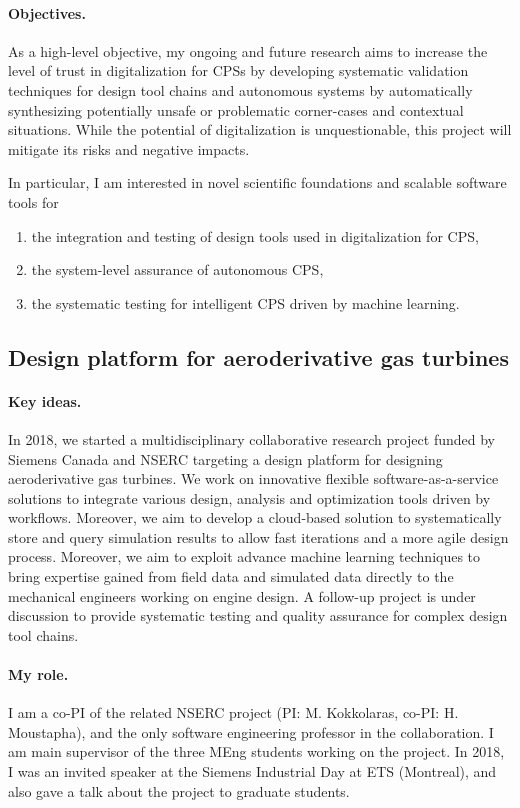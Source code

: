 \paragraph{Objectives.}
As a high-level objective, my ongoing and future research aims to increase the level of trust in digitalization for CPSs by developing systematic validation techniques for design tool chains and autonomous systems by automatically synthesizing potentially unsafe or problematic corner-cases and contextual situations. While the potential of digitalization is unquestionable, this project will mitigate its risks and negative impacts.

In particular, I am interested in novel scientific foundations and scalable software tools for 
\begin{enumerate}
\item the integration and testing of design tools used in digitalization for CPS, 
\item the system-level assurance of autonomous CPS,
\item the systematic testing for intelligent CPS driven by machine learning. 
\end{enumerate}

\subsection{Design platform for aeroderivative gas turbines}

\paragraph{Key ideas.} 
In 2018, we started a multidisciplinary collaborative research project funded by Siemens Canada and NSERC targeting a design platform for designing aeroderivative gas turbines. %
We work on innovative flexible software-as-a-service solutions to integrate various design, analysis and optimization tools driven by workflows. Moreover, we aim to develop a cloud-based solution to systematically store and query simulation results to allow fast iterations and a more agile design process. Moreover, we aim to exploit advance machine learning techniques to bring expertise gained from field data and simulated data directly to the mechanical engineers working on engine design. A follow-up project is under discussion to provide systematic testing and quality assurance for complex design tool chains.

\paragraph{My role.}
I am a co-PI of the related NSERC project (PI: M. Kokkolaras, co-PI: H. Moustapha), and the only software engineering professor in the collaboration. I am main supervisor of the three MEng students working on the project. In 2018, I was an invited speaker at the Siemens Industrial Day at ETS (Montreal), and also gave a talk about the project to graduate students.

